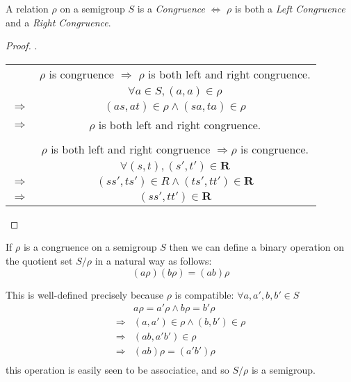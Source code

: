 \begin{Prop}\label{Prop:1.5.1}
    A relation $\rho$ on a semigroup $S$ is a  \emph{Congruence} $\Leftrightarrow$
    $\rho$ is both a \emph{Left Congruence} and a \emph{Right Congruence}.
    \begin{proof}.
        \begin{center}
            \begin{tabular}{c c}
                & $\rho$ is congruence $\Rightarrow $ $\rho$ is both left and right congruence. \\
                & $\forall a\in S, (a,a) \in \rho$  \\
                $\Rightarrow $ & $(as,at)\in \rho \wedge (sa, ta)\in \rho$  \\
                $\Rightarrow $ & $\rho$ is both left and right congruence.  \\
                &   \\
                & $\rho$ is both left and right congruence $\Rightarrow \rho$ is congruence.    \\
                & $\forall (s,t),(s',t')\in \mathbf{R}$  \\
                $\Rightarrow $ & $(ss',ts')\in R \wedge (ts',tt') \in \mathbf{R}$    \\
                $\Rightarrow $ & $(ss',tt')\in \mathbf{R}$
            \end{tabular}
        \end{center}
    \end{proof}
\end{Prop}

If $\rho$ is a congruence on a semigroup $S$ then we can define a binary operation on the quotient set $S/\rho$ in a natural way as follows:
\begin{equation}\label{Eq_1_5_1}
    (a\rho)(b\rho)=(ab)\rho
\end{equation}

This is well-defined precisely because $\rho$ is compatible: 
$\forall a,a',b,b' \in S$
\begin{align*}
    & a\rho=a'\rho \wedge b\rho  =b'\rho                \\
    \Rightarrow & (a,a')\in \rho \wedge (b,b') \in \rho \\
    \Rightarrow & (ab,a'b') \in \rho                    \\
    \Rightarrow & (ab)\rho = (a'b')\rho                 \\
\end{align*}
this operation is easily seen to be associatice, and so $S/\rho$ is a semigroup.

